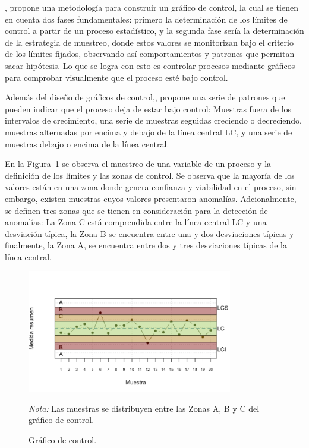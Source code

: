 \documentclass[11pt,a4paper,spanish]{book}
\numberwithin{equation}{chapter}
\numberwithin{figure}{chapter}
\begin{document}
\cite{lopezcano2023spc}, propone una metodología para construir un gráfico de control, 
la cual  se tienen en cuenta dos fases fundamentales: primero la determinación de los 
límites de control a partir de un proceso estadístico, y la segunda fase sería la 
determinación de la estrategia de muestreo, donde estos valores se monitorizan bajo el 
criterio de los límites fijados, observando así comportamientos y patrones que permitan 
sacar hipótesis. 
Lo que se logra con esto es controlar procesos mediante gráficos para comprobar 
visualmente que el proceso esté bajo control.


Además del diseño de gráficos de control,\cite{lopezcano2023spc}, propone una serie de 
patrones que pueden indicar que el proceso deja de estar bajo control: Muestras fuera 
de los intervalos de crecimiento, una serie de muestras seguidas creciendo o decreciendo,
muestras alternadas por encima y debajo de la línea central LC, y una serie de muestras
debajo o encima de la línea central. 


En la Figura~\ref{fig:figGraficoControl} se observa el muestreo de una variable de un 
proceso y la definición de los límites y las zonas de control. 
Se observa que la mayoría de los valores están en una zona donde genera confianza y 
viabilidad en el proceso, sin embargo, existen muestras cuyos valores presentaron anomalías.
Adcionalmente, se definen tres zonas que se tienen en consideración para la 
detección de anomalías: 
La Zona C está comprendida entre la línea central LC y una desviación típica, 
la Zona B se encuentra entre una y dos desviaciones típicas y finalmente, 
la Zona A, se encuentra entre dos y tres desviaciones típicas de la línea central. 


\begin{figure}[H]
	\caption{Gráfico de control. \protect\cite{lopezcano2023spc}}
    \centering
    \includegraphics[width=0.8\textwidth]{media/grafico-control-lopez.png}
    \label{fig:figGraficoControl}
	\parbox{\textwidth}{\footnotesize \textit{Nota:} Las muestras se distribuyen entre las
	Zonas A, B y C del gráfico de control. }
\end{figure}
\end{document}

